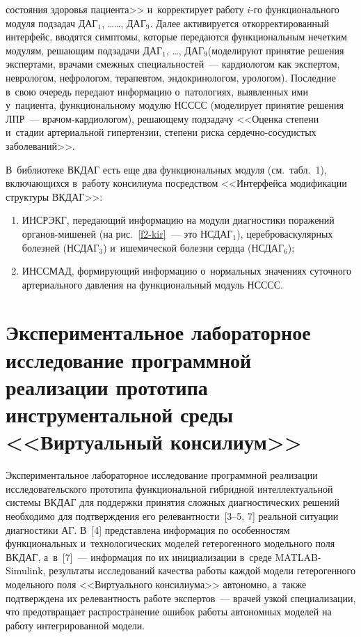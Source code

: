 \begin{multicols}{2}
{состояния здоровья пациента}>> и~корректирует работу $i$-го функционального модуля 
подзадач {ДАГ}$_1$, \ldots\linebreak \ldots , {ДАГ}$_9$. Далее активируется откорректированный 
интерфейс, вводятся симптомы, которые передаются функциональным нечетким модулям, 
решающим подзадачи {ДАГ}$_1$, \ldots , {ДАГ}$_9$\linebreak (моделируют принятие 
решения экспертами, врачами смежных специальностей~--- кардиологом как экспертом, 
неврологом, нефрологом, терапевтом, эндокринологом, урологом). Последние в~свою 
очередь передают информацию о~патологиях, выявленных ими у~пациента, 
функциональному модулю {НСССС} (моделирует принятие решения ЛПР~---  
вра\-чом-кар\-дио\-ло\-гом), решающему подзадачу <<Оценка степени и~стадии 
артериальной гипертензии, степени риска сер\-дечно-сосу\-ди\-стых заболеваний>>. 

В~библиотеке ВКДАГ есть еще два функциональных модуля (см.\ табл.~1), вклю\-ча\-ющих\-ся 
в~работу консилиума посредством <<{Интерфейса модификации структуры 
ВКДАГ}>>: 
      \begin{enumerate}[(1)]
      \item {ИНСРЭКГ}, передающий информацию на модули диагностики поражений 
ор\-га\-нов-ми\-ше\-ней (на рис.~\ref{f2-kir}~--- это {НСДАГ}$_1$), цереброваскулярных 
болезней ({НСДАГ}$_3$) и~ишемической болезни сердца ({НСДАГ}$_6$); 
      \item {ИНССМАД}, формирующий информацию о~нормальных значениях 
суточного артериального давления на функциональный модуль {НСССС}.
      \end{enumerate}
      
\section{Экспериментальное лабораторное исследование программной 
реализации прототипа инструментальной среды <<Виртуальный консилиум>>}
  
  Экспериментальное лабораторное исследование программной реализации 
исследовательского прототипа функциональной гибридной интеллектуальной системы 
ВКДАГ для поддержки принятия сложных диагностических решений необходимо для 
подтверждения его релевантности~[3--5, 7] реальной ситуации диагностики АГ. В~[4] 
пред\-став\-ле\-на информация по особенностям функциональных и~технологических моделей 
гетерогенного модельного поля ВКДАГ, а~в~[7]~--- информация по их инициализации 
в~среде MATLAB-Simulink, результаты исследований качества работы каждой модели 
гетерогенного модельного поля <<Виртуального консилиума>> автономно, а~также 
подтверждена их релевантность работе экспертов~--- врачей узкой специализации, что 
предотвращает распространение ошибок работы автономных моделей на работу 
интегрированной модели. 


\end{multicols}
